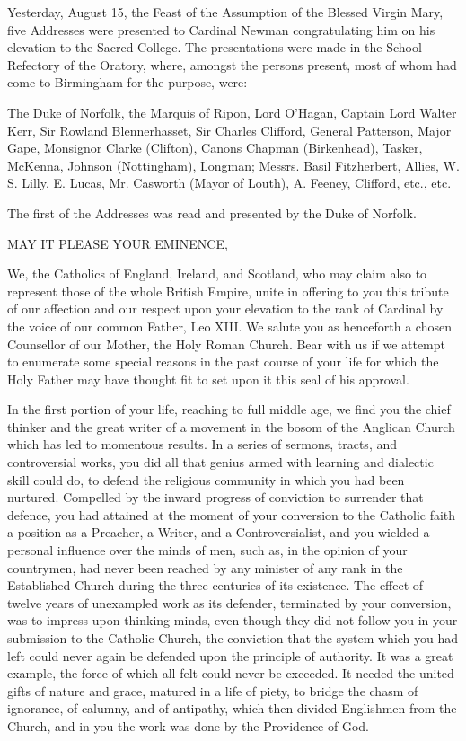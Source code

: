 Yesterday, August 15, the Feast of the Assumption of the Blessed
Virgin Mary, five Addresses were presented to Cardinal Newman
congratulating him on his elevation to the Sacred College. The
presentations were made in the School Refectory of the Oratory, where,
amongst the persons present, most of whom had come to Birmingham for
the purpose, were:—

The Duke of Norfolk, the Marquis of Ripon, Lord O'Hagan, Captain
Lord Walter Kerr, Sir Rowland Blennerhasset, Sir Charles Clifford,
General Patterson, Major Gape, Monsignor Clarke (Clifton), Canons
Chapman (Birkenhead), Tasker, McKenna, Johnson (Nottingham), Longman;
Messrs. Basil Fitzherbert, Allies, W. S. Lilly, E. Lucas, Mr. Casworth
(Mayor of Louth), A. Feeney, Clifford, etc., etc.

The first of the Addresses was read and presented by the Duke of
Norfolk.



MAY IT PLEASE
YOUR EMINENCE,

We, the Catholics of England, Ireland, and Scotland, who may claim
also to represent those of the whole British Empire, unite in offering
to you this tribute of our affection and our respect upon your
elevation to the rank of Cardinal by the voice of our common Father,
Leo XIII. We salute you as henceforth a chosen Counsellor of our
Mother, the Holy Roman Church. Bear with us if we attempt to enumerate
some special reasons in the past course of your life for which the
Holy Father may have thought fit to set upon it this seal of his
approval.

In the first portion of your life, reaching to full middle age, we
find you the chief thinker and the great writer of a movement in the
bosom of the Anglican Church which has led to momentous results. In a
series of sermons, tracts, and controversial works, you did all
that genius armed with learning and dialectic skill could do, to
defend the religious community in which you had been nurtured.
Compelled by the inward progress of conviction to surrender that
defence, you had attained at the moment of your conversion to the
Catholic faith a position as a Preacher, a Writer, and a
Controversialist, and you wielded a personal influence over the minds
of men, such as, in the opinion of your countrymen, had never been
reached by any minister of any rank in the Established Church during
the three centuries of its existence. The effect of twelve years of
unexampled work as its defender, terminated by your conversion, was to
impress upon thinking minds, even though they did not follow you in
your submission to the Catholic Church, the conviction that the system
which you had left could never again be defended upon the principle of
authority. It was a great example, the force of which all felt could
never be exceeded. It needed the united gifts of nature and grace,
matured in a life of piety, to bridge the chasm of ignorance, of
calumny, and of antipathy, which then divided Englishmen from the
Church, and in you the work was done by the Providence of God.

